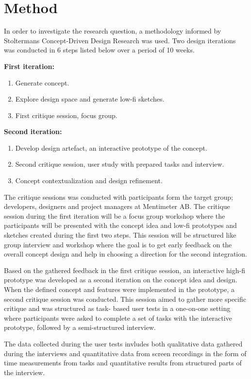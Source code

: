 

\section{Method}
In order to investigate the research question, a methodology informed by Stoltermans Concept-Driven Design Research was used. \cite{stolterman_concept-driven_2010}
Two design iterations was conducted in 6 steps listed below over a period of 10 weeks.

\smallskip
\textbf{First iteration:}
\begin{enumerate}
  \item Generate concept.
  \item Explore design space and generate low-fi sketches.
  \item First critique session, focus group.
\end{enumerate}

\smallskip
\textbf{Second iteration:}
\begin{enumerate}
  \item Develop design artefact, an interactive prototype of the concept.
  \item Second critique session, user study with prepared tasks and interview.
  \item Concept contextualization and design refinement.
\end{enumerate}
\smallskip
The critique sessions was conducted with participants form the target group; developers, designers and project managers at Mentimeter AB. 
The critique session during the first iteration will be a focus group workshop where the participants will be presented with the concept idea and low-fi prototypes and sketches created during the first two steps. 
This session will be structured like group interview and workshop where the goal is to get early feedback on the overall concept design and help in choosing a direction for the second integration.

Based on the gathered feedback in the first critique session, an interactive high-fi prototype was developed as a second iteration on the concept idea and design. 
When the defined concept and features were implemented in the prototype, a second critique session was conducted. 
This session aimed to gather more specific critique and was structured as task- based user tests in a one-on-one setting where participants were asked to complete a set of tasks with the interactive prototype, followed by a semi-structured interview.

The data collected during the user tests invludes both qualitative data gathered during the interviews and quantitative data from screen recordings in the form of time measurements from tasks and quantitative results from structured parts of the interview.